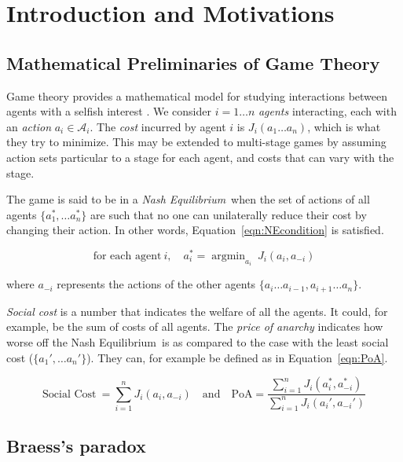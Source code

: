\documentclass[11pt, letterpaper]{article}
\newcommand{\bp}{Braess's paradox}
\newcommand{\NE}{Nash Equilibrium}
\DeclareMathOperator*{\argmin}{argmin}
\begin{document}
\section{Introduction and Motivations}

\subsection{Mathematical Preliminaries of Game Theory}

Game theory provides a mathematical model for studying interactions between agents with a selfish interest \cite{hespanha}. We consider $i = 1 \ldots n$ \emph{agents} interacting, each with an \emph{action} $a_i \in \mathcal{A}_i$. The \emph{cost} incurred by agent $i$ is $J_i(a_1 \ldots a_n)$, which is what they try to minimize. This may be extended to multi-stage games by assuming action sets particular to a stage for each agent, and costs that can vary with the stage.

The game is said to be in a \emph{\NE}~when the set of actions of all agents $\{a_1^*, \ldots a_n^*\}$ are such that no one can unilaterally reduce their cost by changing their action. In other words, Equation~\eqref{eqn:NEcondition} is satisfied.

\begin{equation}
    \label{eqn:NEcondition}
    \text{for each agent}\ i,\quad a_i^* = \argmin_{a_i}\ J_i(a_i, a_{-i})
\end{equation}

where $a_{-i}$ represents the actions of the other agents $\{a_i \ldots a_{i-1}, a_{i+1} \ldots a_n\}$.

\emph{Social cost} is a number that indicates the welfare of all the agents. It could, for example, be the sum of costs of all agents. The \emph{price of anarchy} indicates how worse off the \NE~is as compared to the case with the least social cost ($\{a_1', \ldots a_n'\}$). They can, for example be defined as in Equation~\eqref{eqn:PoA}.

\begin{equation}
    \label{eqn:PoA}
    \text{Social Cost}\ = \sum_{i=1}^{n} J_i(a_i, a_{-i}) \quad \text{and}\quad \text{PoA} = \frac{\sum_{i=1}^{n} J_i(a_i^*, a_{-i}^*)}{\sum_{i=1}^{n} J_i(a_i', a_{-i}')}
\end{equation}

\subsection{\bp}
\end{document}
